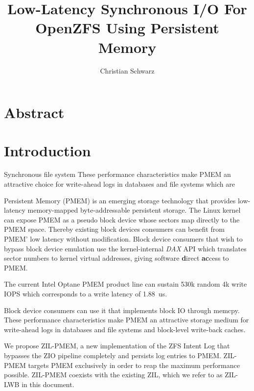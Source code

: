 \documentclass[12pt,a4paper,twoside,draft]{book}
\begin{document}
\frontmatter
{}

\title{Low-Latency Synchronous I/O For OpenZFS Using Persistent Memory}
\author{Christian Schwarz}
\maketitle



\chapter{Abstract}
\blindtext

\mainmatter
\cleardoublepage
{}
{}
\tableofcontents

\chapter{Introduction}
Synchronous file system These performance characteristics make PMEM an attractive choice for write-ahead logs in databases and file systems which are 

Persistent Memory (PMEM) is an emerging storage technology that provides low-latency memory-mapped byte-addressable persistent storage.
The Linux kernel can expose PMEM as a pseudo block device whose sectors map directly to the PMEM space.
Thereby existing block devices consumers can benefit from PMEM' low latency without modification.
Block device consumers that wish to bypass block device emulation use the kernel-internal \textit{DAX} API which translates sector numbers to kernel virtual addresses, giving software \textbf{d}irect \textbf{ac}cess to PMEM.


The current Intel Optane PMEM product line can sustain 530k random 4k write IOPS which corresponds to a write latency of \SI{1.88}{us}.



Block device consumers can use it    that implements block IO  through memcpy.
These performance characteristics make PMEM an attractive storage medium for write-ahead logs in databases and file systems and block-level write-back caches.

We propose ZIL-PMEM, a new implementation of the ZFS Intent Log that bypasses the ZIO pipeline completely and persists log entries to PMEM. ZIL-PMEM targets PMEM exclusively in order to reap the maximum performance possible. ZIL-PMEM coexists with the existing ZIL, which we refer to as ZIL-LWB in this document.
\end{document}
